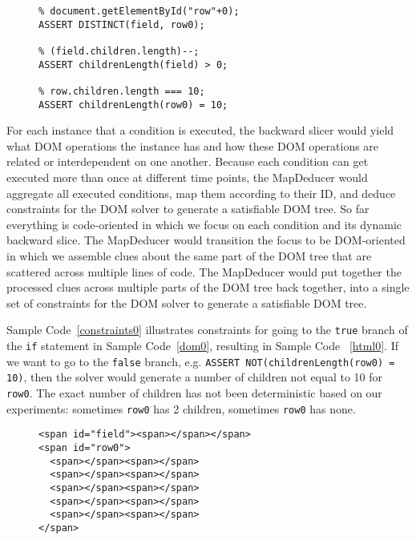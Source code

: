 \begin{figure}
\begin{lstlisting}[caption=Constraints for generating a DOM tree that would satisfy for going the {\tt True} branch in the {\tt if} statement of Sample Code ~\ref{dom0}.  The constraints are shown in the input format for the CVC~\cite{cvc3} implementation of the SMT solver. {\tt \%} is the comment operator in CVC.,label=constraints0]
% document.getElementById("field");
% document.getElementById("row"+0);
ASSERT DISTINCT(field, row0);

% (field.children.length)--;
ASSERT childrenLength(field) > 0;

% row.children.length === 10;
ASSERT childrenLength(row0) = 10;
\end{lstlisting}
\end{figure}


For each instance that a condition is executed, the backward slicer would yield what DOM operations the instance has and how these DOM operations are related or interdependent on one another.  
Because each condition can get executed more than once at different time points, the MapDeducer would aggregate all executed conditions, map them according to their ID, and deduce constraints for the DOM solver to generate a satisfiable DOM tree.  
So far everything is code-oriented in which we focus on each condition and its dynamic backward slice.  The MapDeducer would transition the focus to be DOM-oriented in which we assemble clues about the same part of the DOM tree that are scattered across multiple lines of code.  
The MapDeducer would put together the processed clues across multiple parts of the DOM tree back together, into a single set of constraints for the DOM solver to generate a satisfiable DOM tree.

Sample Code~\ref{constraints0} illustrates constraints for going to the {\tt true} branch of the {\tt if} statement in Sample Code~\ref{dom0}, resulting in Sample Code ~\ref{html0}.  
If we want to go to the {\tt false} branch, e.g. {\tt ASSERT NOT(childrenLength(row0) = 10)}, then the solver would generate a number of children not equal to 10 for {\tt row0}.  The exact number of children has not been deterministic based on our experiments: sometimes {\tt row0} has 2 children, sometimes {\tt row0} has none.  

\begin{figure}
\begin{lstlisting}[caption=Example HTML generated from the results of the DOM solver based on the constraints defined in Sample Code ~\ref{constraints0}.  Note that {\tt row0} is not a child of {\tt field} because the source code in Sample Code \ref{dom0} did not require the rows to be children of {\tt field}.,label=html0]  
<span id="field"><span></span></span>
<span id="row0">
  <span></span><span></span>
  <span></span><span></span>
  <span></span><span></span>
  <span></span><span></span>
  <span></span><span></span>
</span>
\end{lstlisting}
\end{figure}

